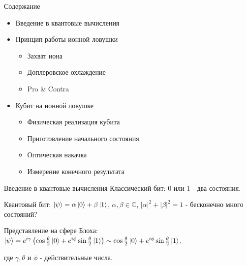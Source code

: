 \documentclass{beamer}
\begin{document}
	\begin{frame}{Содержание}
		
		\begin{itemize}
			
			\item<1-> Введение в квантовые вычисления
			
			
			
			\item<2-> Принцип работы ионной ловушки
			
			\begin{itemize}
				\item{Захват иона}
				\item{Доплеровское охлаждение}
				\item{Pro \& Contra}
			\end{itemize}
			
			\item<3-> Кубит на ионной ловушке
			
			\begin{itemize}
				
				
				\item{Физическая реализация кубита}
				\item{Приготовление начального состояния}
				\item{Оптическая накачка}
				\item{Измерение конечного результата}
				
			\end{itemize}
			
		\end{itemize}
		
		
	\end{frame}
	
	\begin{frame}{Введение в квантовые вычисления}
		Классический бит: $0$ или $1$ - два состояния.
		\vspace{3mm}
		
		Квантовый бит: $\ket{\psi} = \alpha\ket{0} + \beta\ket{1}$, $\alpha,\beta \in \mathbb{C}$, $|\alpha|^2 + |\beta|^2 = 1$ - бесконечно много состояний?
		\vspace{3mm}
		
		Представление на сфере Блоха: $\ket{\psi} = e^{i\gamma}\left(  \cos{\frac{\theta}{2}}\ket{0}+e^{i\phi}\sin{\frac{\theta}{2}} \ket{1}  \right) \sim \cos{\frac{\theta}{2}}\ket{0}+e^{i\phi}\sin{\frac{\theta}{2}} \ket{1} $,
		
		где $\gamma, \theta$ и $\phi$ - действительные числа.
	\end{frame}
	
\end{document}
